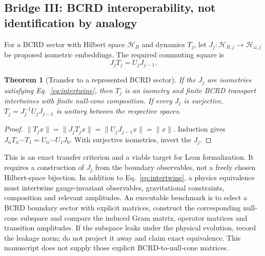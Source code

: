 \documentclass[11pt,a4paper]{article}
\newtheorem{theorem}{Theorem}[section]\newtheorem{proposition}[theorem]{Proposition}\newtheorem{definition}[theorem]{Definition}\newtheorem{example}[theorem]{Example}
\begin{document}
\subsection{Bridge III: BCRD interoperability, not identification by analogy}
For a BCRD sector with Hilbert space $\mathcal H_B$ and dynamics $T_j$, let $J_j:\mathcal H_{B,j}\to\mathcal H_{\omega,j}$ be proposed isometric embeddings. The required commuting square is
\begin{equation}J_j T_j=U_j J_{j-1}.\label{eq:intertwine}\end{equation}
\begin{theorem}[Transfer to a represented BCRD sector]
If the $J_j$ are isometries satisfying Eq.~\eqref{eq:intertwine}, then $T_j$ is an isometry and finite BCRD transport intertwines with finite null-cone composition. If every $J_j$ is surjective, $T_j=J_j^{-1}U_jJ_{j-1}$ is unitary between the respective spaces.
\end{theorem}
\begin{proof} $\|T_j x\|=\|J_jT_jx\|=\|U_jJ_{j-1}x\|=\|x\|$. Induction gives $J_n T_n\cdots T_1=U_n\cdots U_1J_0$. With surjective isometries, invert the $J_j$.\end{proof}
This is an exact transfer criterion and a viable target for Lean formalization. It requires a construction of $J_j$ from the boundary observables, not a freely chosen Hilbert-space bijection. In addition to Eq.~\eqref{eq:intertwine}, a physics equivalence must intertwine gauge-invariant observables, gravitational constraints, composition and relevant amplitudes. An executable benchmark is to select a BCRD boundary sector with explicit matrices, construct the corresponding null-cone subspace and compare the induced Gram matrix, operator matrices and transition amplitudes. If the subspace leaks under the physical evolution, record the leakage norm; do not project it away and claim exact equivalence. This manuscript does not supply those explicit BCRD-to-null-cone matrices.
\end{document}
